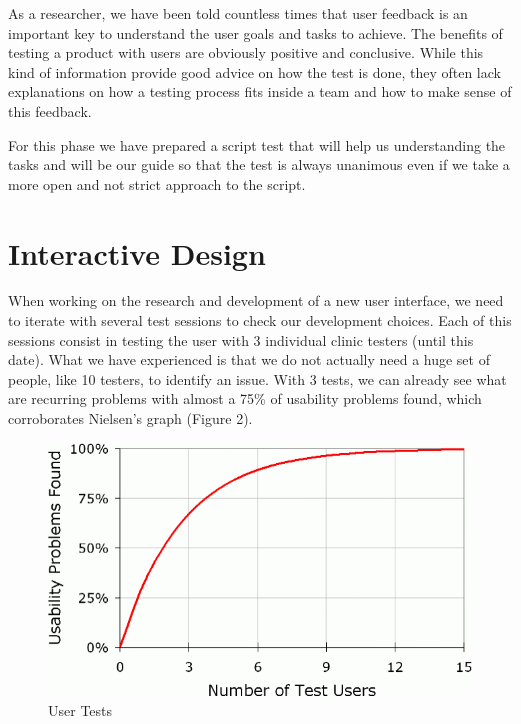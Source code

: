 As a researcher, we have been told countless times that user feedback is an important key to understand the user goals and tasks to achieve. The benefits of testing a product with users are obviously positive and conclusive. While this kind of information provide good advice on how the test is done, they often lack explanations on how a testing process fits inside a team and how to make sense of this feedback.

For this phase we have prepared a script test that will help us understanding the tasks and will be our guide so that the test is always unanimous even if we take a more open and not strict approach to the script.

\clearpage

\section{Interactive Design}

When working on the research and development of a new user interface, we need to iterate with several test sessions to check our development choices. Each of this sessions consist in testing the user with 3 individual clinic testers (until this date). What we have experienced is that we do not actually need a huge set of people, like 10 testers, to identify an issue. With 3 tests, we can already see what are recurring problems with almost a 75\% of usability problems found, which corroborates Nielsen’s graph \cite{needTest} (Figure 2).

\begin{figure}[!hbt]
\centering
\includegraphics[width=1.0\textwidth]{number-of-test-users.png}
\caption{\label{fig:frog}User Tests}
\end{figure}

